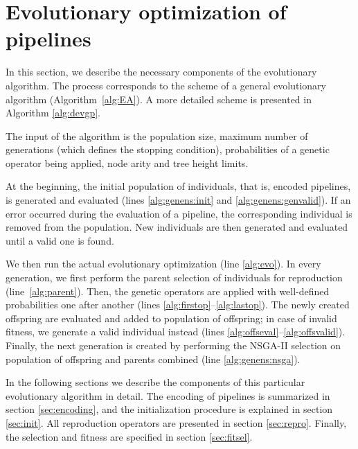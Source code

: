 \section{Evolutionary optimization of pipelines} \label{genens:devGP}
In this section, we describe the necessary components of the evolutionary algorithm.
The process corresponds to the scheme of a general evolutionary algorithm
(Algorithm~\ref{alg:EA}). A more detailed scheme is presented in Algorithm \ref{alg:devgp}.

The input of the algorithm is the population size, maximum number of
generations (which defines the stopping condition), probabilities of a genetic
operator being applied, node arity and tree height limits.

At the beginning, the initial population of individuals, that is, encoded pi\-pe\-li\-nes,
is generated and evaluated (lines \ref{alg:genens:init} and
\ref{alg:genens:genvalid}). If an error occurred during the evaluation of a
pipeline, the corresponding individual is removed from the population. New 
individuals are then generated and evaluated until a valid one is found.

We then run the actual evolutionary optimization (line \ref{alg:evo}).
In every generation, we first perform the parent selection of individuals for
reproduction (line~\ref{alg:parent}). Then, the genetic operators are applied
with well-defined
probabilities one after another (lines \ref{alg:firstop}--\ref{alg:lastop}).
The newly created offspring are evaluated and added
to population of offspring; in case of invalid fitness, we generate a
valid individual instead (lines \ref{alg:offseval}--\ref{alg:offsvalid}).
Finally, the next generation is created by
performing the NSGA-II selection on population of offspring and parents
combined (line \ref{alg:genens:nsga}).

In the following sections we describe the components of this particular
evolutionary algorithm in detail. The encoding of pipelines is summarized in
section \ref{sec:encoding}, and the initialization procedure is explained in
section \ref{sec:init}. All reproduction operators are presented in section
\ref{sec:repro}. Finally, the selection and fitness are specified in section
\ref{sec:fitsel}.


